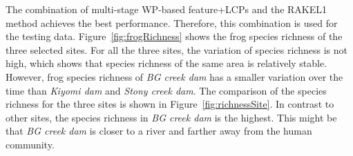 The combination of multi-stage WP-based feature+LCPs and the RAKEL1 method achieves the best performance. Therefore, this combination is used for the testing data. 
Figure~\ref{fig:frogRichness} shows the frog species richness of the three selected sites. For all the three sites, the variation of species richness is not high, which shows that species richness of the same area is relatively stable. However, frog species richness of \textit{BG creek dam} has a smaller variation over the time than \textit{Kiyomi dam} and \textit{Stony creek dam}. The comparison of the species richness for the three sites is shown in Figure~\ref{fig:richnessSite}. In contrast to other sites, the species richness in \textit{BG creek dam} is the highest. This might be that \textit{BG creek dam} is closer to a river and farther away from the human community.


